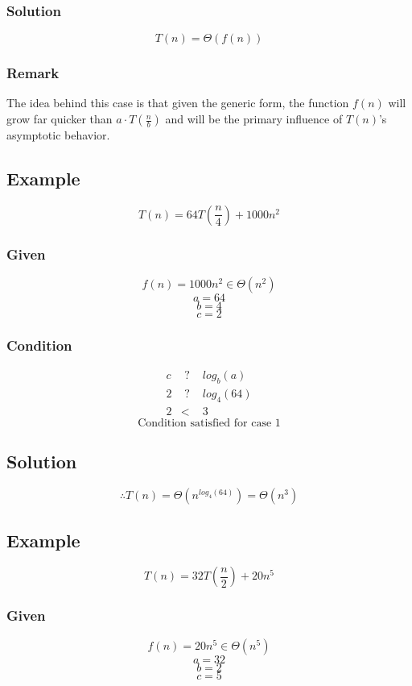 \subsubsection*{Solution}
$$
T(n) = \Theta(f(n))
$$

\subsubsection*{Remark}
The idea behind this case is that given the generic form, the function $f(n)$ will grow far quicker than $a \cdot T(\frac{n}{b})$ and will be the primary influence of $T(n)$'s asymptotic behavior.

\pagebreak

\subsection{Example}
$$
T(n) = 64T(\frac{n}{4}) + 1000n^2
$$

\subsubsection*{Given}
$$f(n) = 1000n^2 \in \Theta(n^2)$$
$$a = 64$$
$$b = 4$$
$$c = 2$$

\subsubsection*{Condition}
\begin{eqnarray*}
	c &\text{ ? }& log_b(a)\\
	2 &\text{ ? }& log_4(64)\\
	2 &<& 3
\end{eqnarray*}
$$\text{Condition satisfied for case 1}$$

\subsection*{Solution}
$$
\therefore T(n) = \Theta(n^{log_4(64)}) = \Theta(n^3)
$$

\subsection{Example}
$$
T(n) = 32T(\frac{n}{2}) + 20n^5
$$

\subsubsection*{Given}
$$f(n) = 20n^5 \in \Theta(n^5)$$
$$a = 32$$
$$b = 2$$
$$c = 5$$

